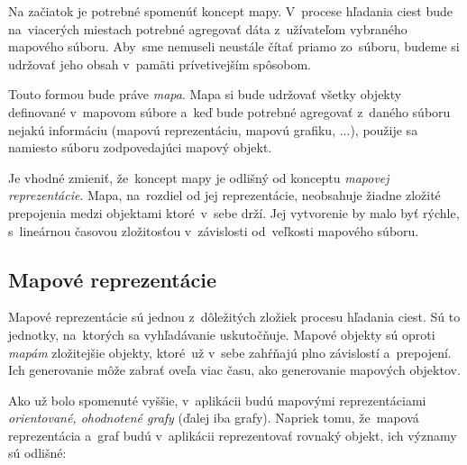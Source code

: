 Na začiatok je potrebné spomenúť koncept mapy. V~procese hľadania ciest bude na~viacerých miestach potrebné agregovať dáta z~užívateľom vybraného mapového súboru. Aby~sme nemuseli neustále čítať priamo zo~súboru, budeme si udržovať jeho obsah v~pamäti prívetivejším spôsobom. 

Touto formou bude práve \textit{mapa}. Mapa si bude udržovať všetky objekty definované v~mapovom súbore a~keď bude potrebné agregovať z~daného súboru nejakú informáciu (mapovú reprezentáciu, mapovú grafiku, ...), použije sa namiesto súboru zodpovedajúci mapový objekt.

Je vhodné zmieniť, že~koncept mapy je odlišný od konceptu \textit{mapovej reprezentácie}. Mapa, na~rozdiel od jej reprezentácie, neobsahuje žiadne zložité prepojenia medzi objektami ktoré~v~sebe drží. Jej vytvorenie by malo byť rýchle, s~lineárnou časovou zložitosťou v~závislosti od~veľkosti mapového súboru.

\subsection{Mapové reprezentácie}\label{mapove_reprezentacie}

Mapové reprezentácie sú jednou z~dôležitých zložiek procesu hľadania ciest. Sú to jednotky, na~ktorých sa vyhľadávanie uskutočňuje. Mapové objekty sú oproti \textit{mapám} zložitejšie objekty, ktoré~už v~sebe zahŕňajú plno závislostí a~prepojení. Ich generovanie môže zabrať oveľa viac času, ako generovanie mapových objektov. 

Ako už bolo spomenuté vyššie, v~aplikácii budú mapovými reprezentáciami \textit{orientované, ohodnotené grafy} (ďalej iba grafy). Napriek tomu, že~mapová reprezentácia a~graf budú v~aplikácii reprezentovať rovnaký objekt, ich významy sú odlišné:

